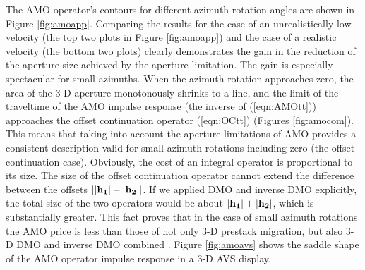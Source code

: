 \par
The AMO operator's contours for
different azimuth rotation angles are shown in  
Figure \ref{fig:amoapp}. 
Comparing the results for the case of an unrealistically low velocity
(the top two plots in Figure \ref{fig:amoapp}) and the case of a realistic
velocity (the bottom two plots) clearly demonstrates  
the gain in the reduction of the aperture size 
achieved by the aperture limitation.
The gain is
especially spectacular for small azimuths. When the azimuth rotation
approaches zero, the area of the 3-D aperture monotonously shrinks to a
line, and the limit of the traveltime of the AMO impulse response
(the inverse of (\ref{eqn:AMOtt})) approaches the offset continuation operator
(\ref{eqn:OCtt}) (Figures \ref{fig:amocom}). This means that
taking into account 
the aperture limitations of AMO provides a consistent description
valid for small azimuth rotations including zero (the offset 
continuation case). Obviously, the cost of an integral operator is
proportional to its size. The size of the offset continuation
operator cannot extend the difference between the offsets ${\bf
\left|\left|h_1\right|-\left|h_2\right|\right|}$. If we applied DMO and
inverse DMO explicitly, the total size of the two operators would be
about ${\bf\left|h_1\right|+\left|h_2\right|}$, which is
substantially greater. This fact proves that in the case of small
azimuth rotations the AMO price is less than those of not only 3-D prestack
migration, but also 3-D DMO and inverse DMO combined \cite[]{anat}.
Figure \ref{fig:amoavs} shows the saddle shape of the AMO operator impulse
response in a 3-D AVS display. 



